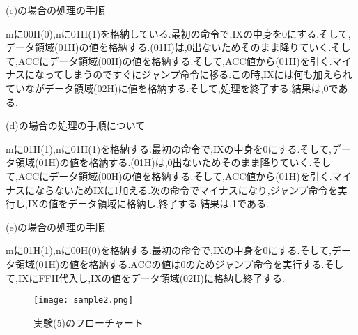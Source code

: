 \documentclass[a4paper,11pt,titlepage]{jarticle}
\begin{document}
\begin{enumerate}
  	(c)の場合の処理の手順\par
  	mに00H(0),nに01H(1)を格納している.最初の命令で,IXの中身を0にする.そして,データ領域(01H)の値を格納する.(01H)は,0出ないためそのまま降りていく.そして,ACCにデータ領域(00H)の値を格納する.そして,ACC値から(01H)を引く.マイナスになってしまうのですぐにジャンプ命令に移る.この時,IXには何も加えられていながデータ領域(02H)に値を格納する.そして,処理を終了する.結果は,0である.\par
  	(d)の場合の処理の手順について\par
  	mに01H(1),nに01H(1)を格納する.最初の命令で,IXの中身を0にする.そして,データ領域(01H)の値を格納する.(01H)は,0出ないためそのまま降りていく.そして,ACCにデータ領域(00H)の値を格納する.そして,ACC値から(01H)を引く.マイナスにならないためIXに1加える.次の命令でマイナスになり,ジャンプ命令を実行し,IXの値をデータ領域に格納し,終了する.結果は,1である.\par
  	(e)の場合の処理の手順\par
  	mに01H(1),nに00H(0)を格納する.最初の命令で,IXの中身を0にする.そして,データ領域(01H)の値を格納する.ACCの値は0のためジャンプ命令を実行する.そして,IXにFFH代入し,IXの値をデータ領域(02H)に格納し終了する.\par
  	\clearpage

   
   \begin{figure}[htbp]
  \centering
  \texttt{[image: sample2.png]}
  \label{実験(5)のフローチャート}\\
  \caption{実験(5)のフローチャート}
\end{figure}
 \end{enumerate}
 
   
\end{document}
